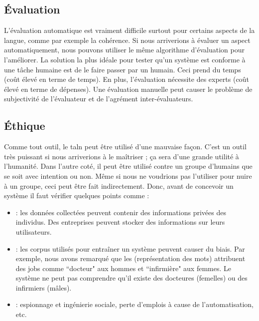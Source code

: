 \documentclass{KodeBook}
\begin{document}
\subsection{Évaluation}

L'évaluation automatique est vraiment difficile surtout pour certains aspects de la langue, comme par exemple la cohérence. 
Si nous arriverions à évaluer un aspect automatiquement, nous pouvons utiliser le même algorithme d'évaluation pour l'améliorer. 
La solution la plus idéale pour tester qu'un système est conforme à une tâche humaine est de le faire passer par un humain.
Ceci prend du temps (coût élevé en terme de temps). 
En plus, l'évaluation nécessite des experts (coût élevé en terme de dépenses).
Une évaluation manuelle peut causer le problème de subjectivité de l'évaluateur et de l'agrément inter-évaluateurs.

\subsection{Éthique}

Comme tout outil, le \ac{taln} peut être utilisé d'une mauvaise façon. 
C'est un outil très puissant si nous arriverions à le maîtriser ; ça sera d'une grande utilité à l'humanité. 
Dans l'autre coté, il peut être utilisé contre un groupe d'humains que se soit avec intention ou non. 
Même si nous ne voudrions pas l'utiliser pour nuire à un groupe, ceci peut être fait indirectement. 
Donc, avant de concevoir un système il faut vérifier quelques points comme :
\begin{itemize}
	\item {} : les données collectées peuvent contenir des informations privées des individus. Des entreprises peuvent stocker des informations sur leurs utilisateurs. 
	\item {} : les corpus utilisés pour entraîner un système peuvent causer du biais.
	Par exemple, nous avons remarqué que les  (représentation des mots) attribuent des jobs comme ``docteur" aux hommes et ``infirmière" aux femmes. 
	Le système ne peut pas comprendre qu'il existe des docteures (femelles) ou des infirmiers (mâles).
	\item {} : espionnage et ingénierie sociale, perte d'emplois à cause de l'automatisation, etc.
\end{itemize}
\end{document}
